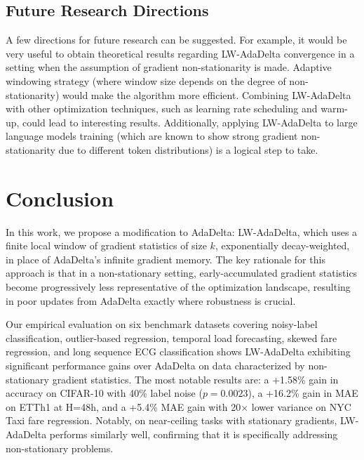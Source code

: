 \documentclass[11pt,a4paper]{article}
\begin{document}
\subsection{Future Research Directions}

A few directions for future research can be suggested. For example, it would be very useful to obtain theoretical results regarding LW-AdaDelta convergence in a setting when the assumption of gradient non-stationarity is made. Adaptive windowing strategy (where window size depends on the degree of non-stationarity) would make the algorithm more efficient. Combining LW-AdaDelta with other optimization techniques, such as learning rate scheduling and warm-up, could lead to interesting results. Additionally, applying LW-AdaDelta to large language models training (which are known to show strong gradient non-stationarity due to different token distributions) is a logical step to take.

\section{Conclusion}
\label{sec:conclusion}

In this work, we propose a modification to AdaDelta: LW-AdaDelta, which uses a finite local window of gradient statistics of size $k$, exponentially decay-weighted, in place of AdaDelta's infinite gradient memory. The key rationale for this approach is that in a non-stationary setting, early-accumulated gradient statistics become progressively less representative of the optimization landscape, resulting in poor updates from AdaDelta exactly where robustness is crucial.

Our empirical evaluation on six benchmark datasets covering noisy-label classification, outlier-based regression, temporal load forecasting, skewed fare regression, and long sequence ECG classification shows LW-AdaDelta exhibiting significant performance gains over AdaDelta on data characterized by non-stationary gradient statistics. The most notable results are: a +1.58\% gain in accuracy on CIFAR-10 with 40\% label noise ($p=0.0023$), a +16.2\% gain in MAE on ETTh1 at H=48h, and a +5.4\% MAE gain with 20$\times$ lower variance on NYC Taxi fare regression. Notably, on near-ceiling tasks with stationary gradients, LW-AdaDelta performs similarly well, confirming that it is specifically addressing non-stationary problems.
\end{document}
